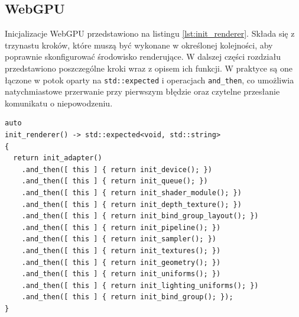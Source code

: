 \subsection{WebGPU}
Inicjalizacje WebGPU przedstawiono na listingu \ref{lst:init_renderer}. Składa się z trzynastu kroków, które muszą być wykonane w określonej kolejności, aby poprawnie skonfigurować środowisko renderujące. W dalszej części rozdziału przedstawiono poszczególne kroki wraz z opisem ich funkcji. W praktyce są one łączone w potok oparty na \texttt{std::expected} i operacjach \texttt{and\_then}, co umożliwia natychmiastowe przerwanie przy pierwszym błędzie oraz czytelne przesłanie komunikatu o niepowodzeniu.
\begin{lstlisting}[caption={Funkcja inicjalizująca WebGPU, stworzona jako potok}, label={lst:init_renderer}]
auto
init_renderer() -> std::expected<void, std::string>
{
  return init_adapter()
    .and_then([ this ] { return init_device(); })
    .and_then([ this ] { return init_queue(); })
    .and_then([ this ] { return init_shader_module(); })
    .and_then([ this ] { return init_depth_texture(); })
    .and_then([ this ] { return init_bind_group_layout(); })
    .and_then([ this ] { return init_pipeline(); })
    .and_then([ this ] { return init_sampler(); })
    .and_then([ this ] { return init_textures(); })
    .and_then([ this ] { return init_geometry(); })
    .and_then([ this ] { return init_uniforms(); })
    .and_then([ this ] { return init_lighting_uniforms(); })
    .and_then([ this ] { return init_bind_group(); });
}
\end{lstlisting}

